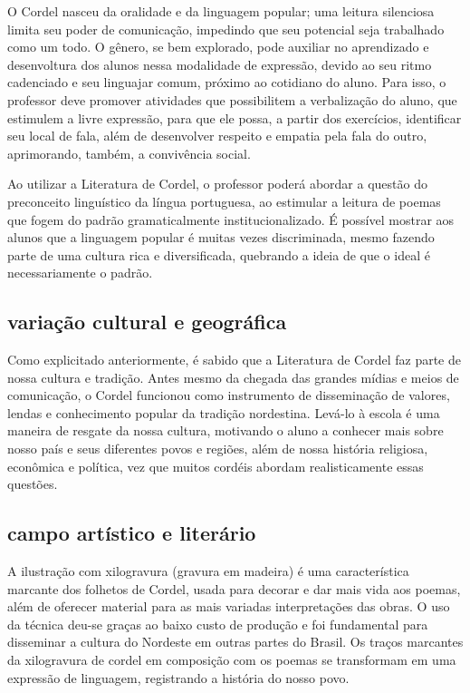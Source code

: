 \documentclass[12pt]{extarticle}
\begin{document}
O Cordel nasceu da oralidade e da linguagem popular; uma leitura
silenciosa limita seu poder de comunicação, impedindo que seu potencial
seja trabalhado como um todo. O gênero, se bem explorado, pode auxiliar
no aprendizado e desenvoltura dos alunos nessa modalidade de expressão,
devido ao seu ritmo cadenciado e seu linguajar comum, próximo ao
cotidiano do aluno. Para isso, o professor deve promover atividades que
possibilitem a verbalização do aluno, que estimulem a livre expressão,
para que ele possa, a partir dos exercícios, identificar seu local de
fala, além de desenvolver respeito e empatia pela fala do outro,
aprimorando, também, a convivência social.

Ao utilizar a Literatura de Cordel, o professor poderá abordar a questão
do preconceito linguístico da língua portuguesa, ao estimular a leitura
de poemas que fogem do padrão gramaticalmente institucionalizado. É
possível mostrar aos alunos que a linguagem popular é muitas vezes
discriminada, mesmo fazendo parte de uma cultura rica e diversificada,
quebrando a ideia de que o ideal é necessariamente o padrão.

\subsection{variação cultural e geográfica}

Como explicitado anteriormente, é sabido que a Literatura de Cordel faz
parte de nossa cultura e tradição. Antes mesmo da chegada das grandes
mídias e meios de comunicação, o Cordel funcionou como instrumento de
disseminação de valores, lendas e conhecimento popular da tradição
nordestina. Levá-lo à escola é uma maneira de resgate da nossa cultura,
motivando o aluno a conhecer mais sobre nosso país e seus diferentes
povos e regiões, além de nossa história religiosa, econômica e política,
vez que muitos cordéis abordam realisticamente essas questões.

\subsection{campo artístico e literário}

A ilustração com xilogravura (gravura em madeira) é uma característica
marcante dos folhetos de Cordel, usada para decorar e dar mais vida aos
poemas, além de oferecer material para as mais variadas interpretações
das obras. O uso da técnica deu-se graças ao baixo custo de produção e
foi fundamental para disseminar a cultura do Nordeste em outras partes
do Brasil. Os traços marcantes da xilogravura de cordel em composição
com os poemas se transformam em uma expressão de linguagem, registrando
a história do nosso povo.
\end{document}
